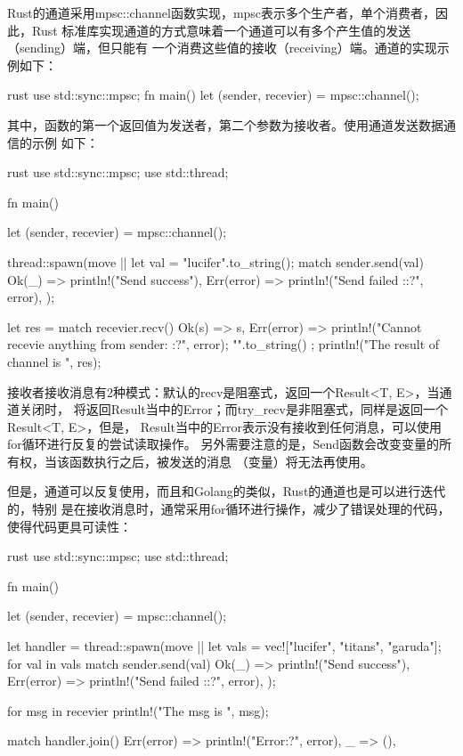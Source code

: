 Rust的通道采用mpsc::channel函数实现，mpsc表示多个生产者，单个消费者，因此，Rust
标准库实现通道的方式意味着一个通道可以有多个产生值的发送（sending）端，但只能有
一个消费这些值的接收（receiving）端。通道的实现示例如下：
\begin{code-block}{rust}
use std::sync::mpsc;
fn main() {
    let (sender, recevier) = mpsc::channel();
}
\end{code-block}
其中，函数的第一个返回值为发送者，第二个参数为接收者。使用通道发送数据通信的示例
如下：
\begin{code-block}{rust}
use std::sync::mpsc;
use std::thread;

fn main() {
    let (sender, recevier) = mpsc::channel();

    thread::spawn(move || {
        let val = "lucifer".to_string();
        match sender.send(val) {
            Ok(_) => println!("Send success"),
            Err(error) => println!("Send failed :{:?}", error),
        }
    });

    let res = match recevier.recv() {
        Ok(s) => s,
        Err(error) => {
            println!("Cannot recevie anything from sender: {:?}", error);
            "".to_string()
        }
    };
    println!("The result of channel is {}", res);
}
\end{code-block}
接收者接收消息有2种模式：默认的recv是阻塞式，返回一个Result<T, E>，当通道关闭时，
将返回Result当中的Error；而try\_recv是非阻塞式，同样是返回一个Result<T, E>，但是，
Result当中的Error表示没有接收到任何消息，可以使用for循环进行反复的尝试读取操作。
另外需要注意的是，Send函数会改变变量的所有权，当该函数执行之后，被发送的消息
（变量）将无法再使用。

但是，通道可以反复使用，而且和Golang的类似，Rust的通道也是可以进行迭代的，特别
是在接收消息时，通常采用for循环进行操作，减少了错误处理的代码，使得代码更具可读性：
\begin{code-block}{rust}
use std::sync::mpsc;
use std::thread;

fn main() {
    let (sender, recevier) = mpsc::channel();

    let handler = thread::spawn(move || {
        let vals = vec!["lucifer", "titans", "garuda"];
        for val in vals {
            match sender.send(val) {
                Ok(_) => println!("Send success"),
                Err(error) => println!("Send failed :{:?}", error),
            }
        }
    });

    for msg in recevier {
        println!("The msg is {}", msg);
    }

    match handler.join() {
        Err(error) => println!("Error{:?}", error),
        _ => (),
    }
}
\end{code-block}

